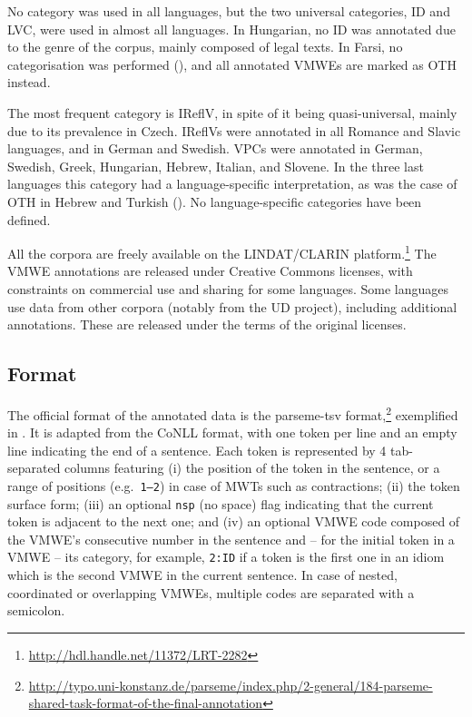 \documentclass[output=paper,modfonts]{langscibook}
\begin{document}
No category was used in all languages, but the two universal categories, ID and LVC, were used in almost all languages. In Hungarian, no ID was annotated due to the genre of the corpus, mainly composed of legal texts. In Farsi, no categorisation was performed (), and all annotated VMWEs are marked as OTH instead.

The most frequent category is IReflV, in spite of it being quasi-universal, mainly due to its prevalence in Czech. IReflVs were annotated in all Romance and Slavic languages, and in German and Swedish. VPCs were annotated in German, Swe\-dish, Greek, Hungarian, Hebrew, Italian, and Slovene. In the three last languages this category had a language-specific interpretation, as was the case of OTH in Hebrew and Turkish  (). No language-specific categories have been defined. 

All the corpora are freely available on the LINDAT/CLARIN platform.\footnote{\url{http://hdl.handle.net/11372/LRT-2282}} The VMWE annotations are released under Creative Commons licenses, with constraints on commercial use and sharing for some languages. Some languages use data from other corpora (notably from the UD project), including additional annotations. These are released under the terms of the original licenses.

\subsection{Format}
\label{sec:format}
%

The official format of the annotated data is the parseme-tsv format,\footnote{\url{http://typo.uni-konstanz.de/parseme/index.php/2-general/184-parseme-shared-task-format-of-the-final-annotation}} exemplified in . It is adapted from the CoNLL format, with one token per line and an empty line indicating the end of a sentence. Each token is represented by 4 tab-separated columns featuring (i) the position of the token in the sentence, or a range of positions (e.g.\ \texttt{1--2}) in case of MWTs such as contractions; (ii) the token surface form; (iii) an optional \texttt{nsp} (no space) flag indicating that the current token is adjacent to the next one; %
and (iv) an optional VMWE code composed of the VMWE's consecutive number in the sentence and -- for the initial token in a VMWE -- its category, for example, \texttt{2:ID} if a token is the first one in  an idiom which is the second VMWE in the current sentence. In case of nested, coordinated or overlapping VMWEs, multiple codes are separated with a semicolon.
\end{document}
